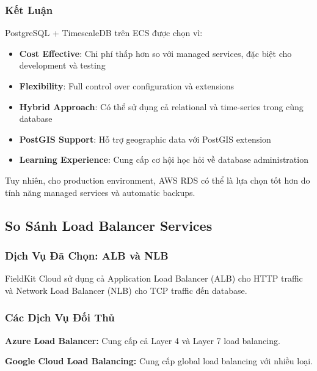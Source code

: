 \subsubsection{Kết Luận}

PostgreSQL + TimescaleDB trên ECS được chọn vì:
\begin{itemize}
    \item \textbf{Cost Effective}: Chi phí thấp hơn so với managed services, đặc biệt cho development và testing
    \item \textbf{Flexibility}: Full control over configuration và extensions
    \item \textbf{Hybrid Approach}: Có thể sử dụng cả relational và time-series trong cùng database
    \item \textbf{PostGIS Support}: Hỗ trợ geographic data với PostGIS extension
    \item \textbf{Learning Experience}: Cung cấp cơ hội học hỏi về database administration
\end{itemize}

Tuy nhiên, cho production environment, AWS RDS có thể là lựa chọn tốt hơn do tính năng managed services và automatic backups.

\subsection{So Sánh Load Balancer Services}

\subsubsection{Dịch Vụ Đã Chọn: ALB và NLB}

FieldKit Cloud sử dụng cả Application Load Balancer (ALB) cho HTTP traffic và Network Load Balancer (NLB) cho TCP traffic đến database.

\subsubsection{Các Dịch Vụ Đối Thủ}

\textbf{Azure Load Balancer:} Cung cấp cả Layer 4 và Layer 7 load balancing.

\textbf{Google Cloud Load Balancing:} Cung cấp global load balancing với nhiều loại.

